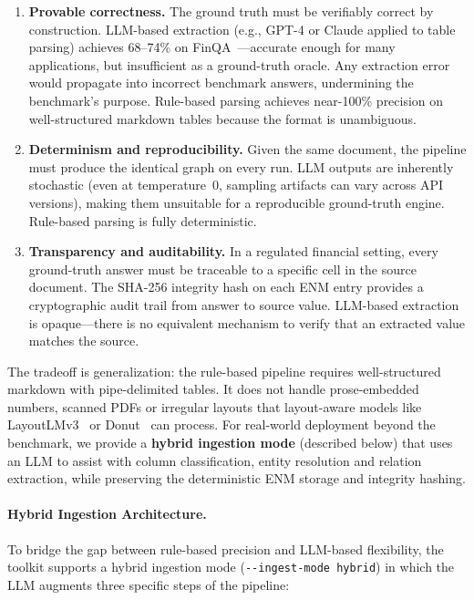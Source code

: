 \documentclass[11pt]{article}
\begin{document}
\begin{enumerate}[leftmargin=2em]
  \item \textbf{Provable correctness.}  The ground truth must be
    verifiably correct by construction.  LLM-based extraction
    (e.g., GPT-4 or Claude applied to table parsing) achieves
    68--74\% on FinQA~\citep{chen2021finqa}---accurate enough for many
    applications, but insufficient as a ground-truth oracle.  Any
    extraction error would propagate into incorrect benchmark answers,
    undermining the benchmark's purpose.  Rule-based parsing achieves
    near-100\% precision on well-structured markdown tables because
    the format is unambiguous.

  \item \textbf{Determinism and reproducibility.}  Given the same
    document, the pipeline must produce the identical graph on every
    run.  LLM outputs are inherently stochastic (even at temperature~0,
    sampling artifacts can vary across API versions), making them
    unsuitable for a reproducible ground-truth engine.  Rule-based
    parsing is fully deterministic.

  \item \textbf{Transparency and auditability.}  In a regulated
    financial setting, every ground-truth answer must be traceable to
    a specific cell in the source document.  The SHA-256 integrity hash
    on each ENM entry provides a cryptographic audit trail from answer
    to source value.  LLM-based extraction is opaque---there is no
    equivalent mechanism to verify that an extracted value matches the
    source.
\end{enumerate}

\noindent
The tradeoff is generalization: the rule-based pipeline requires
well-structured markdown with pipe-delimited tables.  It does not
handle prose-embedded numbers, scanned PDFs or irregular layouts
that layout-aware models like LayoutLMv3~\citep{huang2022layoutlmv3}
or Donut~\citep{kim2022donut} can process.  For real-world
deployment beyond the benchmark, we provide a \textbf{hybrid
ingestion mode} (described below) that uses an LLM to assist with
column classification, entity resolution and relation extraction,
while preserving the deterministic ENM storage and integrity hashing.

\paragraph{Hybrid Ingestion Architecture.}
To bridge the gap between rule-based precision and LLM-based
flexibility, the toolkit supports a hybrid ingestion mode
(\texttt{-{}-ingest-mode hybrid}) in which the LLM augments
three specific steps of the pipeline:
\end{document}
